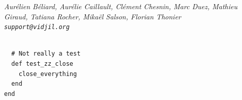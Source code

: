 \documentclass[11pt]{report}
\begin{document}





\vfill
\flushright \it Aurélien Béliard, Aurélie Caillault, Clément Chesnin, Marc Duez, Mathieu Giraud, Tatiana Rocher, Mikaël Salson, Florian Thonier
\\ \texttt{support@vidjil.org}


\begin{verbatim}

  # Not really a test
  def test_zz_close
    close_everything
  end
end
\end{verbatim}
\end{document}
